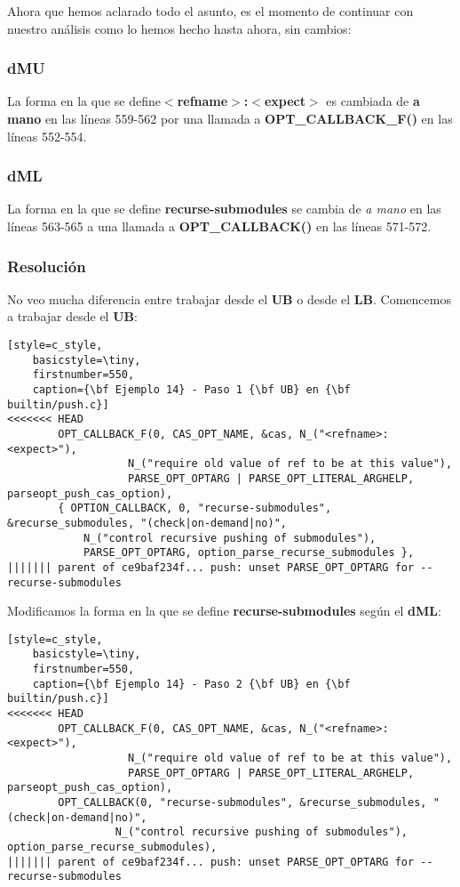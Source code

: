 Ahora que hemos aclarado todo el asunto, es el momento de continuar con nuestro análisis como lo hemos hecho hasta ahora, sin cambios:

\subsubsection{dMU}
La forma en la que se define{\bf $<$refname$>$:$<$expect$>$} es cambiada de {\bf a mano} en las líneas 559-562 por una llamada a
{\bf OPT\_CALLBACK\_F()} en las líneas 552-554.

\subsubsection{dML}
La forma en la que se define {\bf recurse-submodules} se cambia de {\it a mano} en las líneas 563-565 a una llamada a
{\bf OPT\_CALLBACK()} en las líneas 571-572.

\subsubsection{Resolución}
No veo mucha diferencia entre trabajar desde el {\bf UB} o desde el {\bf LB}. Comencemos a trabajar desde el {\bf UB}:

\begin{lstlisting}[style=c_style,
	basicstyle=\tiny,
	firstnumber=550,
	caption={\bf Ejemplo 14} - Paso 1 {\bf UB} en {\bf builtin/push.c}]
<<<<<<< HEAD
		OPT_CALLBACK_F(0, CAS_OPT_NAME, &cas, N_("<refname>:<expect>"),
			       N_("require old value of ref to be at this value"),
			       PARSE_OPT_OPTARG | PARSE_OPT_LITERAL_ARGHELP, parseopt_push_cas_option),
		{ OPTION_CALLBACK, 0, "recurse-submodules", &recurse_submodules, "(check|on-demand|no)",
			N_("control recursive pushing of submodules"),
			PARSE_OPT_OPTARG, option_parse_recurse_submodules },
||||||| parent of ce9baf234f... push: unset PARSE_OPT_OPTARG for --recurse-submodules
\end{lstlisting}

Modificamos la forma en la que se define {\bf recurse-submodules} según el {\bf dML}:
\begin{lstlisting}[style=c_style,
	basicstyle=\tiny,
	firstnumber=550,
	caption={\bf Ejemplo 14} - Paso 2 {\bf UB} en {\bf builtin/push.c}]
<<<<<<< HEAD
		OPT_CALLBACK_F(0, CAS_OPT_NAME, &cas, N_("<refname>:<expect>"),
			       N_("require old value of ref to be at this value"),
			       PARSE_OPT_OPTARG | PARSE_OPT_LITERAL_ARGHELP, parseopt_push_cas_option),
		OPT_CALLBACK(0, "recurse-submodules", &recurse_submodules, "(check|on-demand|no)",
			     N_("control recursive pushing of submodules"), option_parse_recurse_submodules),
||||||| parent of ce9baf234f... push: unset PARSE_OPT_OPTARG for --recurse-submodules
\end{lstlisting}

